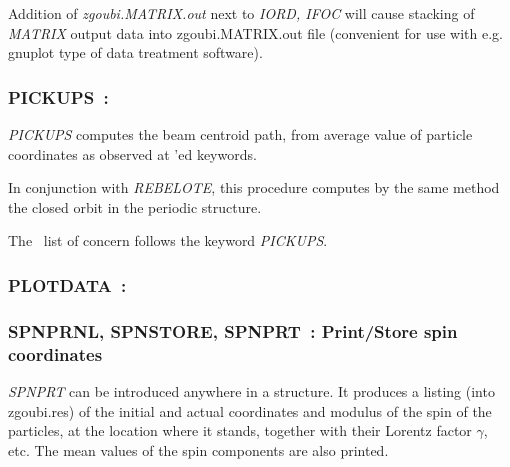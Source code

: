  

\bigskip

\noindent  Addition of \textsl{zgoubi.MATRIX.out} next to \textsl{IORD, IFOC} will cause 
stacking of \textsl{MATRIX} output data 
into   zgoubi.MATRIX.out file (convenient for use with e.g. gnuplot type of data treatment software). 


\newpage

 
\subsubsection*{PICKUPS~: \PICKUPSTitl}\label{PICKUPS} 
\medskip

\noindent \textsl{PICKUPS} computes the beam centroid path, from average value of particle 
coordinates as observed at \LABEL'ed keywords.

\medskip
\noindent In conjunction with \textsl{REBELOTE}, this procedure computes by the same method the closed orbit in 
the periodic structure. 

\medskip
\noindent The \LABEL\ list of concern follows the keyword  \textsl{PICKUPS}.





\newpage


\subsubsection*{PLOTDATA~: \PLOTDATATitl~\protect\cite{BiblioPlot}}%
\label{PLOTDATA} 

\bigskip


\newpage

\subsubsection*{SPNPRNL, SPNSTORE, SPNPRT~: Print/Store spin coordinates 
  }\label{SPNPRT}\label{SPNPRNL} \label{SPNSTORE}

\noindent \textsl{SPNPRT} can be introduced anywhere in a structure. It produces
a listing (into zgoubi.res) of the initial and actual coordinates and modulus of the spin of the \IMAX{}
particles, at the location where it stands, together with their Lorentz factor $\gamma$, etc. 
The mean values of the spin components are also printed. 

